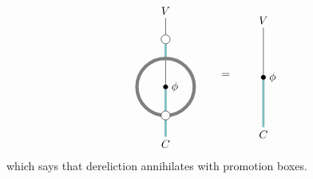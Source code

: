 \documentclass[english,letter paper,12pt,reqno]{article}
\def\drawbang{\draw[color=teal!50, line width=2pt]}
\def\drawprom{\draw[color=gray, line width=3pt]}
\def\mapnode{\node[circle,draw=black,fill=black,inner sep=0.5mm]}
\def\dernode{\node[circle,draw=black,fill=white]}
\theoremstyle{example}
\begin{document}
\begin{equation}\label{eq:prom_cancel_der}
\begin{tikzpicture}[scale=0.6,auto,inner sep=1mm,baseline=(current  bounding  box.center)]
\node (top) at (0,4) {$V$};
\dernode (altop) at (0,2.5) {};
\node (bottom) at (0,-3) {$C$};
\mapnode (o) at (0,0) {};
\node [right] at (o.east) {$\phi$};
\draw (o) to (0,2);
\drawbang (bottom) -- (0,-1.5);
\drawbang (0,1.5) -- (altop);
\draw (altop) -- (top);
\drawbang (0,-1.5) -- (o);
\drawprom (0,0) ellipse (1.5cm and 1.5cm);
\dernode (bottom) at (0,-1.5) {};
\end{tikzpicture}
\qquad = \qquad
\begin{tikzpicture}[scale=0.6,auto,inner sep=1mm,baseline=(current  bounding  box.center)]
\node (top) at (0,3) {$V$};
\node (bottom) at (0,-3) {$C$};
\mapnode (o) at (0,0) {};
\node [right] at (o.east) {$\phi$};
\drawbang (bottom) -- (o);
\draw (o) -- (top);
\end{tikzpicture}
\end{equation}
which says that dereliction annihilates with promotion boxes.
\end{document}
